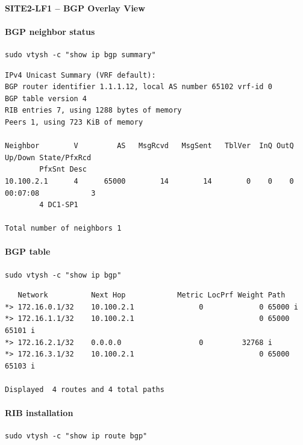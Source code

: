 \documentclass[11pt]{article}
\begin{document}
\paragraph{SITE2-LF1 -- BGP Overlay View}

\paragraph{BGP neighbor status}

\begin{verbatim}
sudo vtysh -c "show ip bgp summary"
\end{verbatim}

\begin{verbatim}
IPv4 Unicast Summary (VRF default):
BGP router identifier 1.1.1.12, local AS number 65102 vrf-id 0
BGP table version 4
RIB entries 7, using 1288 bytes of memory
Peers 1, using 723 KiB of memory

Neighbor        V         AS   MsgRcvd   MsgSent   TblVer  InQ OutQ  Up/Down State/PfxRcd
        PfxSnt Desc
10.100.2.1      4      65000        14        14        0    0    0 00:07:08            3
        4 DC1-SP1

Total number of neighbors 1
\end{verbatim}

\paragraph{BGP table}

\begin{verbatim}
sudo vtysh -c "show ip bgp"
\end{verbatim}

\begin{verbatim}
   Network          Next Hop            Metric LocPrf Weight Path
*> 172.16.0.1/32    10.100.2.1               0             0 65000 i
*> 172.16.1.1/32    10.100.2.1                             0 65000 65101 i
*> 172.16.2.1/32    0.0.0.0                  0         32768 i
*> 172.16.3.1/32    10.100.2.1                             0 65000 65103 i

Displayed  4 routes and 4 total paths
\end{verbatim}

\paragraph{RIB installation}

\begin{verbatim}
sudo vtysh -c "show ip route bgp"
\end{verbatim}
\end{document}
